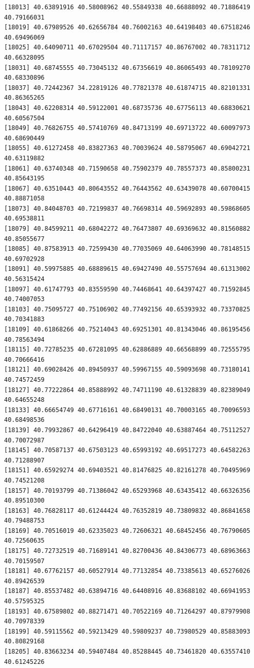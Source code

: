 \documentclass[
  letterpaper,
  DIV=11,
  numbers=noendperiod]{scrartcl}
\begin{document}
\begin{verbatim}
[18013] 40.63891916 40.58008962 40.55849338 40.66888092 40.71886419 40.79166031
[18019] 40.67989526 40.62656784 40.76002163 40.64198403 40.67518246 40.69496069
[18025] 40.64090711 40.67029504 40.71117157 40.86767002 40.78311712 40.66328095
[18031] 40.68745555 40.73045132 40.67356619 40.86065493 40.78109270 40.68330896
[18037] 40.72442367 34.22819126 40.77821378 40.61874715 40.82101331 40.86365265
[18043] 40.62208314 40.59122001 40.68735736 40.67756113 40.68830621 40.60567504
[18049] 40.76826755 40.57410769 40.84713199 40.69713722 40.60097973 40.68690449
[18055] 40.61272458 40.83827363 40.70039624 40.58795067 40.69042721 40.63119882
[18061] 40.63740348 40.71590658 40.75902379 40.78557373 40.85800231 40.85643195
[18067] 40.63510443 40.80643552 40.76443562 40.63439078 40.60700415 40.88871058
[18073] 40.84048703 40.72199837 40.76698314 40.59692893 40.59868605 40.69538811
[18079] 40.84599211 40.68042272 40.76473807 40.69369632 40.81560882 40.85055677
[18085] 40.87583913 40.72599430 40.77035069 40.64063990 40.78148515 40.69702928
[18091] 40.59975885 40.68889615 40.69427490 40.55757694 40.61313002 40.56315424
[18097] 40.61747793 40.83559590 40.74468641 40.64397427 40.71592845 40.74007053
[18103] 40.75095727 40.75106902 40.77492156 40.65393932 40.73370825 40.70341883
[18109] 40.61868266 40.75214043 40.69251301 40.81343046 40.86195456 40.78563494
[18115] 40.72785235 40.67281095 40.62886889 40.66568899 40.72555795 40.70666416
[18121] 40.69028426 40.89450937 40.59967155 40.59093698 40.73180141 40.74572459
[18127] 40.77222864 40.85888992 40.74711190 40.61328839 40.82389049 40.64655248
[18133] 40.66654749 40.67716161 40.68490131 40.70003165 40.70096593 40.68498536
[18139] 40.79932867 40.64296419 40.84722040 40.63887464 40.75112527 40.70072987
[18145] 40.70587137 40.67503123 40.65993192 40.69517273 40.64582263 40.71288907
[18151] 40.65929274 40.69403521 40.81476825 40.82161278 40.70495969 40.74521208
[18157] 40.70193799 40.71386042 40.65293968 40.63435412 40.66326356 40.89510300
[18163] 40.76828117 40.61244424 40.76352819 40.73809832 40.86841658 40.79488753
[18169] 40.70516019 40.62335023 40.72606321 40.68452456 40.76790605 40.72560635
[18175] 40.72732519 40.71689141 40.82700436 40.84306773 40.68963663 40.70159507
[18181] 40.67762157 40.60527914 40.77132854 40.73385613 40.65276026 40.89426539
[18187] 40.85537482 40.63894716 40.64408916 40.83688102 40.66941953 40.57595325
[18193] 40.67589802 40.88271471 40.70522169 40.71264297 40.87979908 40.70978339
[18199] 40.59115562 40.59213429 40.59809237 40.73980529 40.85883093 40.80829168
[18205] 40.83663234 40.59407484 40.85288445 40.73461820 40.63557410 40.61245226

\end{verbatim}
\end{document}
